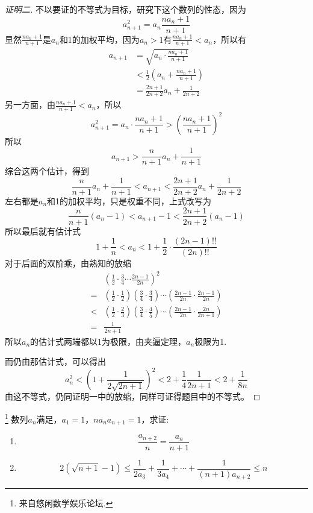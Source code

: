 \begin{proof}[证明二]
 不以要证的不等式为目标，研究下这个数列的性态，因为
\[ a_{n+1}^2=a_n \frac{na_n+1}{n+1} \]
显然$\frac{na_n+1}{n+1}$是$a_n$和1的加权平均，因为$a_n>1$有$\frac{na_n+1}{n+1}<a_n$，所以有
\begin{align*}
a_{n+1} &=\sqrt{a_n\cdot \frac{na_n+1}{n+1}} \\
& <\frac{1}{2} \left( a_n+\frac{na_n+1}{n+1} \right)  \\
& = \frac{2n+1}{2n+2}a_n+\frac{1}{2n+2}
\end{align*}
另一方面，由$\frac{na_n+1}{n+1}<a_n$，所以
\[ a_{n+1}^2=a_n \cdot  \frac{na_n+1}{n+1} > \left( \frac{na_n+1}{n+1} \right)^2 \]
所以
\[ a_{n+1}>\frac{n}{n+1}a_n+\frac{1}{n+1} \]
综合这两个估计，得到
\[ \frac{n}{n+1}a_n+\frac{1}{n+1} < a_{n+1} < \frac{2n+1}{2n+2}a_n+\frac{1}{2n+2} \]
左右都是$a_n$和1的加权平均，只是权重不同，上式改写为
\[ \frac{n}{n+1}(a_n-1) < a_{n+1}-1 < \frac{2n+1}{2n+2} (a_n-1) \]
所以最后就有估计式
\[ 1+\frac{1}{n} < a_n < 1 + \frac{1}{2} \cdot \frac{(2n-1)!!}{(2n)!!} \]
对于后面的双阶乘，由熟知的放缩
\begin{align*}
& \left( \frac{1}{2} \cdot \frac{3}{4} \cdots \frac{2n-1}{2n} \right)^2 \\
={} & \left( \frac{1}{2} \cdot \frac{1}{2} \right) \left(\frac{3}{4} \cdot \frac{3}{4} \right) \cdots \left( \frac{2n-1}{2n} \cdot \frac{2n-1}{2n} \right) \\
<{} & \left( \frac{1}{2} \cdot \frac{2}{3} \right) \left( \frac{3}{4} \cdot \frac{4}{5} \right) \cdots \left( \frac{2n-1}{2n} \cdot \frac{2n}{2n+1} \right) \\
={} & \frac{1}{2n+1}
\end{align*}
所以$a_n$的估计式两端都以1为极限，由夹逼定理，$a_n$极限为1.

而仍由那估计式，可以得出
\[ a_n^2< \left( 1+\frac{1}{2\sqrt{2n+1}} \right)^2 <2+\frac{1}{4} \frac{1}{2n+1} < 2+\frac{1}{8n} \]
由这不等式，仍同证明一中的放缩，同样可证得题目中的不等式。 
\end{proof}

\begin{exercise}\footnote{来自悠闲数学娱乐论坛.}
  数列$a_n$满足，$a_1=1$，$na_na_{n+1}=1$，求证: 
  \begin{enumerate}
  \item
    \[ \frac{a_{n+2}}{n} = \frac{a_n}{n+1} \]
  \item
    \[ 2(\sqrt{n+1}-1) \leqslant \frac{1}{2a_3}+\frac{1}{3a_4}+\cdots+\frac{1}{(n+1)a_{n+2}} \leqslant n \]
  \end{enumerate}
\end{exercise}

